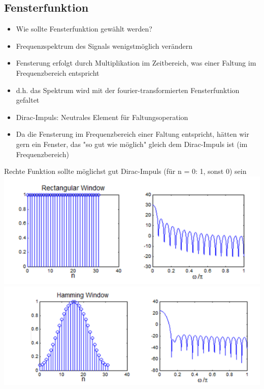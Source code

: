 \documentclass[a4paper,10pt,oneside]{article}
\begin{document}
\subsection{Fensterfunktion}
\begin{itemize}
	\item Wie sollte Fensterfunktion gewählt werden?
	\item Frequenzspektrum des Signals wenigstmöglich verändern
	\item Fensterung erfolgt durch Multiplikation im Zeitbereich, was einer Faltung im Frequenzbereich entspricht
	\item d.h. das Spektrum wird mit der fourier-transformierten Fensterfunktion gefaltet
	\item Dirac-Impuls: Neutrales Element für Faltungsoperation
	\item Da die Fensterung im Frequenzbereich einer Faltung entspricht, hätten wir gern ein Fenster, das "so gut wie möglich" gleich dem Dirac-Impuls ist (im Frequenzbereich)
\end{itemize}
Rechte Funktion sollte möglichst gut Dirac-Impuls (für n = 0: 1, sonst 0) sein
\includegraphics[scale=0.65]{Grafiken/rechteckfensterfunktion.png}\\
\includegraphics[scale=0.65]{Grafiken/hammingfenster.png}\\
\end{document}
